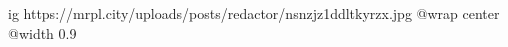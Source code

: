  
 
 
 
 

\ifcmt
  ig https://mrpl.city/uploads/posts/redactor/nsnzjz1ddltkyrzx.jpg
  @wrap center
  @width 0.9
\fi
